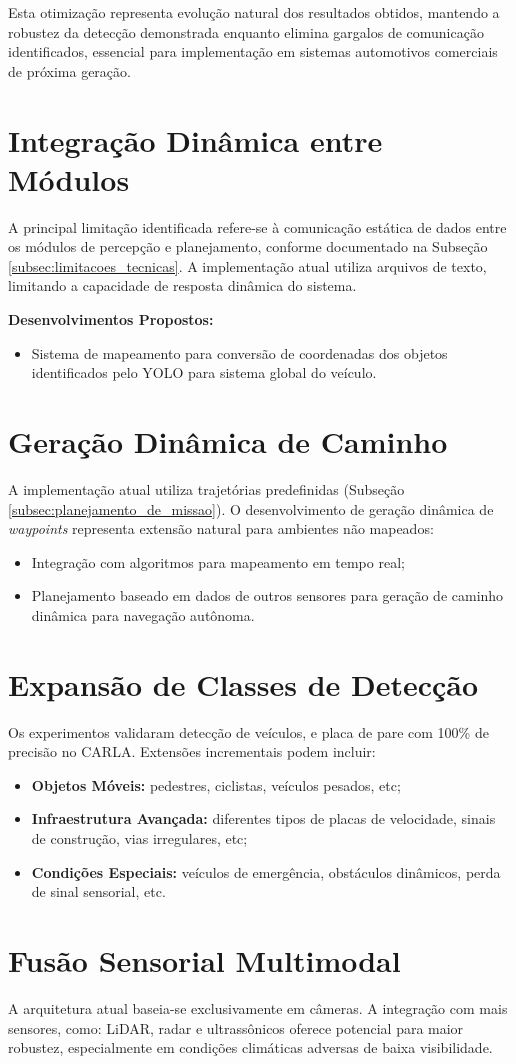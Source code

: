 Esta otimização representa evolução natural dos resultados obtidos, mantendo a robustez da detecção demonstrada enquanto elimina gargalos de comunicação identificados, essencial para implementação em sistemas automotivos comerciais de próxima geração.

\section{Integração Dinâmica entre Módulos}

A principal limitação identificada refere-se à comunicação estática de dados entre os módulos de percepção e planejamento, conforme documentado na Subseção \ref{subsec:limitacoes_tecnicas}. A implementação atual utiliza arquivos de texto, limitando a capacidade de resposta dinâmica do sistema.

\textbf{Desenvolvimentos Propostos:}
\begin{itemize}
\item Sistema de mapeamento para conversão de coordenadas dos objetos identificados pelo YOLO para sistema global do veículo.
\end{itemize}

\section{Geração Dinâmica de Caminho}

A implementação atual utiliza trajetórias predefinidas (Subseção \ref{subsec:planejamento_de_missao}). O desenvolvimento de geração dinâmica de \textit{waypoints} representa extensão natural para ambientes não mapeados:

\begin{itemize}
\item Integração com algoritmos para mapeamento em tempo real;
\item Planejamento baseado em dados de outros sensores para geração de caminho dinâmica para navegação autônoma.
\end{itemize}

\section{Expansão de Classes de Detecção}

Os experimentos validaram detecção de veículos, e placa de pare com 100\% de precisão no CARLA. Extensões incrementais podem incluir:

\begin{itemize}
\item \textbf{Objetos Móveis:} pedestres, ciclistas, veículos pesados, etc;
\item \textbf{Infraestrutura Avançada:} diferentes tipos de placas de velocidade, sinais de construção, vias irregulares, etc;
\item \textbf{Condições Especiais:} veículos de emergência, obstáculos dinâmicos, perda de sinal sensorial, etc.
\end{itemize}


\section{Fusão Sensorial Multimodal}

A arquitetura atual baseia-se exclusivamente em câmeras. A integração com mais sensores, como: LiDAR, radar e ultrassônicos oferece potencial para maior robustez, especialmente em condições climáticas adversas de baixa visibilidade.

